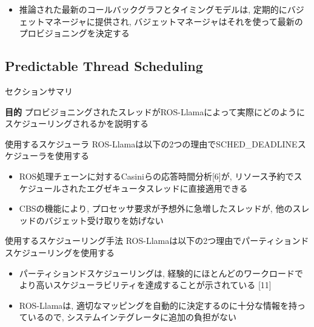 \begin{frame}{}
    \begin{itemize}
        \item 推論された最新のコールバックグラフとタイミングモデルは, 定期的にバジェットマネージャに提供され, バジェットマネージャはそれを使って最新のプロビジョニングを決定する
    \end{itemize}
\end{frame}


\subsection{Predictable Thread Scheduling}
\label{ssec: predictable thread scheduling}

\begin{frame}{セクションサマリ}
    \begin{itembox}[l]{\textbf{目的}}
        プロビジョニングされたスレッドがROS-Llamaによって実際にどのようにスケジューリングされるかを説明する
    \end{itembox}
\end{frame}

\begin{frame}{使用するスケジューラ}
    ROS-Llamaは以下の2つの理由でSCHED\_DEADLINEスケジューラを使用する
    \begin{itemize}
        \item ROS処理チェーンに対するCasiniらの応答時間分析[6]が, リソース予約でスケジュールされたエグゼキュータスレッドに直接適用できる
        \item CBSの機能により, プロセッサ要求が予想外に急増したスレッドが, 他のスレッドのバジェット受け取りを妨げない
    \end{itemize}
\end{frame}

\begin{frame}{使用するスケジューリング手法}
    ROS-Llamaは以下の2つ理由でパーティションドスケジューリングを使用する
    \begin{itemize}
        \item パーティションドスケジューリングは, 経験的にほとんどのワークロードでより高いスケジューラビリティを達成することが示されている [11]
        \item ROS-Llamaは, 適切なマッピングを自動的に決定するのに十分な情報を持っているので, システムインテグレータに追加の負担がない
    \end{itemize}
\end{frame}

